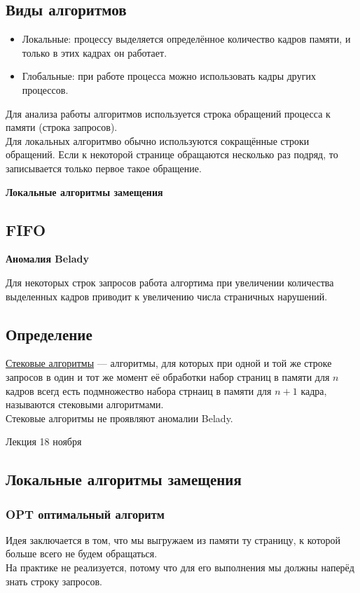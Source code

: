\documentclass[12pt, a4paper]{article}
\begin{document}
    \subsection*{Виды алгоритмов}
    \begin{itemize}
        \item Локальные: процессу выделяется определённое количество кадров памяти, и только в этих кадрах он работает.
        \item Глобальные: при работе процесса можно использовать кадры других процессов.
    \end{itemize}
    Для анализа работы алгоритмов используется строка обращений процесса к памяти (строка запросов).\\
    Для локальных алгоритмво обычно используются сокращённые строки обращений. Если к некоторой странице обращаются несколько раз подряд, то записывается только первое такое обращение.
    \begin{center}
        \bf Локальные алгоритмы замещения
    \end{center}
    \subsection*{FIFO}
    \begin{center}
        \bf Аномалия Belady
    \end{center}
    Для некоторых строк запросов работа алгортима при увеличении количества выделенных кадров приводит к увеличению числа страничных нарушений.
    \subsection*{Определение}
    \underline{Стековые алгоритмы} --- алгоритмы, для которых при одной и той же строке запросов в один и тот же момент её обработки набор страниц в памяти для $n$ кадров всегд есть подмножество набора стрнаиц в памяти для $n + 1$ кадра, называются стековыми алгоритмами.\\
    Стековые алгоритмы не проявляют аномалии Belady.
    \begin{center}
        Лекция 18 ноября
    \end{center}
    \subsection{Локальные алгоритмы замещения}
    \subsubsection{OPT оптимальный алгоритм}
    Идея заключается в том, что мы выгружаем из памяти ту страницу, к которой больше всего не будем обращаться.\\
    На практике не реализуется, потому что для его выполнения мы должны наперёд знать строку запросов.
\end{document}

